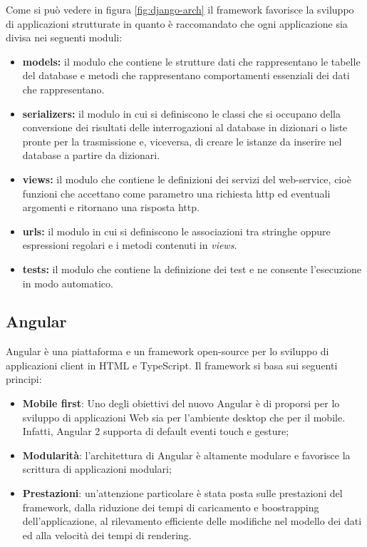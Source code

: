 	Come si può vedere in figura \ref{fig:django-arch} il framework favorisce la sviluppo di applicazioni strutturate in quanto è raccomandato che ogni applicazione sia divisa nei seguenti moduli:
	\begin{itemize}
	\item \textbf{models:} il modulo che contiene le strutture dati che rappresentano le tabelle del database e metodi che rappresentano comportamenti essenziali dei dati che rappresentano.
	\item \textbf{serializers:} il modulo in cui si definiscono le classi che si occupano della conversione dei risultati delle interrogazioni al database in dizionari o liste pronte per la trasmissione e, viceversa, di creare le istanze da inserire nel database a partire da dizionari.
	\item \textbf{views:} il modulo che contiene le definizioni dei servizi del web-service, cioè funzioni che accettano come parametro una richiesta \gls{http} ed eventuali argomenti e ritornano una risposta \gls{http}.
	\item \textbf{urls:} il modulo in cui si definiscono le associazioni tra stringhe oppure espressioni regolari e i metodi contenuti in \textit{views}.
	\item \textbf{tests:} il modulo che contiene la definizione dei test e ne consente l'esecuzione in modo automatico.
	\end{itemize}
	
	\subsection{Angular}
	\label{tec:angular}
	Angular è una piattaforma e un framework open-source per lo sviluppo di applicazioni client in HTML e TypeScript.
	Il framework si basa sui seguenti principi:
	\begin{itemize}
	\item \textbf{Mobile first}: Uno degli obiettivi del nuovo Angular è di proporsi per lo sviluppo di applicazioni Web sia per l’ambiente desktop che per il mobile. Infatti, Angular 2 supporta di default eventi touch e gesture;
	\item \textbf{Modularità}: l’architettura di Angular  è altamente modulare e favorisce la
	scrittura di applicazioni modulari;
	\item \textbf{Prestazioni}: un’attenzione particolare è stata posta sulle prestazioni del framework, dalla riduzione dei tempi di caricamento e boostrapping dell’applicazione, al rilevamento efficiente delle modifiche nel modello dei dati ed alla velocità dei tempi di rendering.
	\end{itemize}

